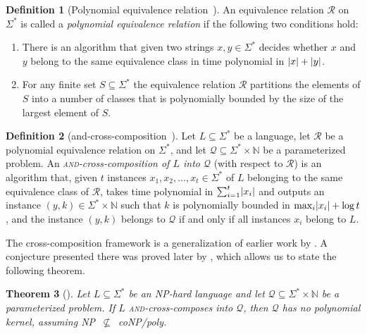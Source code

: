\documentclass[11pt]{article}
\theoremstyle{plain}
\newtheorem{theorem}{Theorem}
\theoremstyle{definition}
\newtheorem{definition}[theorem]{Definition}
\theoremstyle{remark}
\newcommand{\N}{\mathbb{N}}
\newcommand{\NP}{{\smaller[0.83]\textsf{\textup{NP}}}}
\newcommand{\coNP}{{\smaller[0.83]\textsf{\textup{coNP}}}}
\newcommand{\poly}{{\smaller[0.83]\textsf{\textup{poly}}}}
\newcommand{\Hip}{\NP~$\not\subseteq$~\coNP/\poly}
\DeclarePairedDelimiter\abs{\lvert}{\rvert}
\begin{document}
\begin{appendices}
\begin{definition}[Polynomial equivalence relation~\citep{kernelization-cross-composition}]
\label{def:polynomial-equivalence-relation}
    An equivalence relation $\mathcal{R}$ on $\Sigma^*$ is called a \emph{polynomial equivalence relation} if the following two conditions hold:
    \begin{enumerate}
        \item There is an algorithm that given two strings $x, y \in \Sigma^*$ decides whether $x$ and $y$ belong to the same equivalence class in time polynomial in $\abs{x} + \abs{y}$.
        \item For any finite set $S \subseteq \Sigma^*$ the equivalence relation $\mathcal{R}$ partitions the elements of $S$ into a number of classes that is polynomially bounded by the size of the largest element of $S$.
    \end{enumerate}
\end{definition}

\begin{definition}[{\sc and}-cross-composition~\citep{kernelization-cross-composition}]
\label{def:and-cross-composition}
    Let $L \subseteq \Sigma^*$  be a language, let $\mathcal{R}$ be a polynomial equivalence relation on $\Sigma^*$, and let $\mathcal{Q} \subseteq \Sigma^* \times \N$ be a parameterized problem. An \emph{\textsc{and}-cross-composition of $L$ into $\mathcal{Q}$} (with respect to $\mathcal{R}$) is an algorithm that, given $t$ instances $x_1, x_2, \dots, x_t \in \Sigma^*$ of $L$ belonging to the same equivalence class of $\mathcal{R}$, takes time polynomial in $\sum_{i=1}^t \abs{x_i}$ and outputs an instance $(y, k) \in \Sigma^* \times \N$ such that $k$ is polynomially bounded in $\max_i \abs{x_i} + \log t$, and the instance $(y, k)$ belongs to $\mathcal{Q}$ if and only if all instances $x_i$ belong to $L$.
\end{definition}

The cross-composition framework is a generalization of earlier work by \citet{composition-kernelization}. A conjecture presented there was proved later by \citet{and-distillation-conjecture-proof}, which allows us to state the following theorem.

\begin{theorem}[\citep{kernelization-cross-composition}]
\label{theorem:and-cross-composition-kernelization-lower-bound}
    Let $L \subseteq \Sigma^*$ be an \NP-hard language and let $\mathcal{Q} \subseteq \Sigma^* \times \N$ be a parameterized problem. If $L$ \textsc{and}-cross-composes into $\mathcal{Q}$, then $\mathcal{Q}$ has no polynomial kernel, assuming \Hip.
\end{theorem}


\end{appendices}
\end{document}
